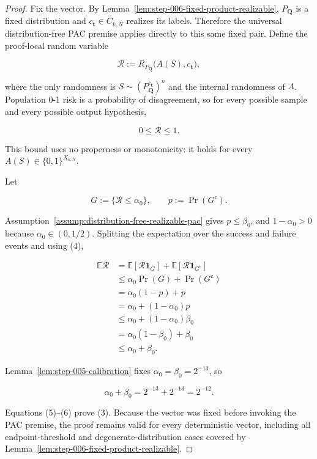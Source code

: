 \begin{proof}
Fix the vector. By
Lemma~\ref{lem:step-006-fixed-product-realizable},
\(P_{\boldsymbol Q}\) is a fixed distribution and
\(c_{\boldsymbol t}\in C_{k,N}\) realizes its labels. Therefore the
universal distribution-free PAC premise applies directly to this same
fixed pair. Define the proof-local random variable

\[
\mathcal R
:=R_{P_{\boldsymbol Q}}\bigl(A(S),c_{\boldsymbol t}\bigr),
\]

where the only randomness is
\(S\sim(P_{\boldsymbol Q}^{c_{\boldsymbol t}})^n\) and the internal
randomness of \(A\). Population 0-1 risk is a probability of disagreement,
so for every possible sample and every possible output hypothesis,

\[
0\le\mathcal R\le1.
\tag{4}
\]

This bound uses no properness or monotonicity: it holds for every
\(A(S)\in\{0,1\}^{X_{k,N}}\).

Let

\[
G:=\{\mathcal R\le\alpha_0\},
\qquad p:=\Pr(G^{\mathsf c}).
\]

Assumption~\ref{assump:distribution-free-realizable-pac} gives
\(p\le\beta_0\), and \(1-\alpha_0>0\) because
\(\alpha_0\in(0,1/2)\). Splitting the expectation over the success and
failure events and using (4),

\[
\begin{aligned}
\mathbb E\mathcal R
&=\mathbb E[\mathcal R\mathbf 1_G]
  +\mathbb E[\mathcal R\mathbf 1_{G^{\mathsf c}}]\\
&\le \alpha_0\Pr(G)+\Pr(G^{\mathsf c})\\
&=\alpha_0(1-p)+p\\
&=\alpha_0+(1-\alpha_0)p\\
&\le\alpha_0+(1-\alpha_0)\beta_0\\
&=\alpha_0(1-\beta_0)+\beta_0\\
&\le\alpha_0+\beta_0.
\end{aligned}
\tag{5}
\]

Lemma~\ref{lem:step-005-calibration} fixes
\(\alpha_0=\beta_0=2^{-13}\), so

\[
\alpha_0+\beta_0=2^{-13}+2^{-13}=2^{-12}.
\tag{6}
\]

Equations (5)--(6) prove (3). Because the vector was fixed before invoking
the PAC premise, the proof remains valid for every deterministic vector,
including all endpoint-threshold and degenerate-distribution cases covered
by Lemma~\ref{lem:step-006-fixed-product-realizable}. \end{proof}

